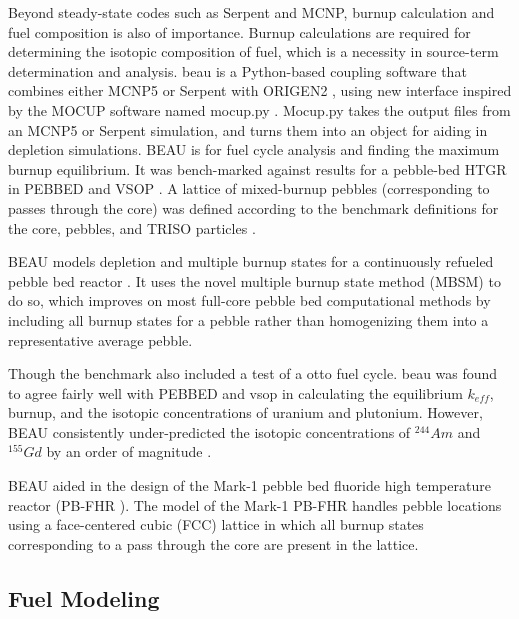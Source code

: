 Beyond steady-state codes such as Serpent and MCNP, burnup calculation and fuel composition is also of importance.  Burnup calculations are required for determining the isotopic composition of fuel, which is a necessity in source-term determination and analysis. \acrfull{beau} is a Python-based coupling software that combines either MCNP5 or Serpent with ORIGEN2 \cite{croff_origen2_1983}, using new interface inspired by the MOCUP \cite{babcock_mocup_1995} software named mocup.py \cite{cisneros_pebble_2013}.  Mocup.py takes the output files from an MCNP5 or Serpent simulation, and turns them into an object for aiding in depletion simulations.  BEAU is for fuel cycle analysis and finding the maximum burnup equilibrium.  It was bench-marked against results for a pebble-bed HTGR in PEBBED \cite{terry_direct_2002} and VSOP \cite{ruetten_vsop_2005}.  A lattice of mixed-burnup pebbles (corresponding to passes through the core) was defined according to the benchmark definitions for the core, pebbles, and TRISO particles \cite{cisneros_pebble_2013}.


BEAU models depletion and multiple burnup states for a continuously refueled pebble bed reactor \cite{cisneros_pebble_2013}. It uses the novel multiple burnup state method (MBSM) to do so, which improves on most full-core pebble bed computational methods by including all burnup states for a pebble rather than homogenizing them into a representative average pebble.


Though the benchmark also included a test of a \acrfull{otto} fuel cycle.  \acrshort{beau} was found to agree fairly well with PEBBED and \acrshort{vsop} in calculating the equilibrium $k_{eff}$, burnup, and the isotopic concentrations of uranium and plutonium.  However, BEAU consistently under-predicted the isotopic concentrations of $^{244}Am$ and $^{155}Gd$ by an order of magnitude \cite{cisneros_pebble_2013}.

BEAU aided in the design of the Mark-1 pebble bed fluoride high temperature reactor (PB-FHR \cite{cisneros_pebble_2013}).  The model of the Mark-1 PB-FHR handles pebble locations using a face-centered cubic (FCC) lattice in which all burnup states corresponding to a pass through the core are  present in the lattice.


\subsection{Fuel Modeling}

